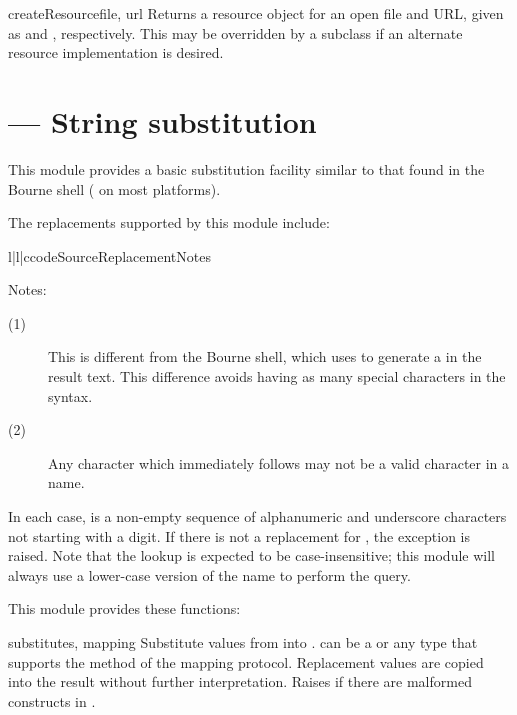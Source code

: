 \documentclass{howto}
\begin{document}
\begin{methoddesc}[loader]{createResource}{file, url}
  Returns a resource object for an open file and URL, given as
   and , respectively.  This may be overridden by a
  subclass if an alternate resource implementation is desired.
\end{methoddesc}


\section{ --- String substitution}


This module provides a basic substitution facility similar to that
found in the Bourne shell ( on most \UNIX{} platforms).  

The replacements supported by this module include:

\begin{tableiii}{l|l|c}{code}{Source}{Replacement}{Notes}
\end{tableiii}

\noindent
Notes:
\begin{description}
  \item[(1)]  This is different from the Bourne shell, which uses
              \code{\textbackslash\$} to generate a \character{\$} in
              the result text.  This difference avoids having as many
              special characters in the syntax.

  \item[(2)]  Any character which immediately follows  may
              not be a valid character in a name.
\end{description}

In each case,  is a non-empty sequence of alphanumeric and
underscore characters not starting with a digit.  If there is not a
replacement for , the exception
 is raised.
Note that the lookup is expected to be case-insensitive; this module
will always use a lower-case version of the name to perform the query.

This module provides these functions:

\begin{funcdesc}{substitute}{s, mapping}
  Substitute values from  into .  
  can be a  or any type that supports the 
  method of the mapping protocol.  Replacement
  values are copied into the result without further interpretation.
  Raises  if there are malformed
  constructs in .
\end{funcdesc}
\end{document}

